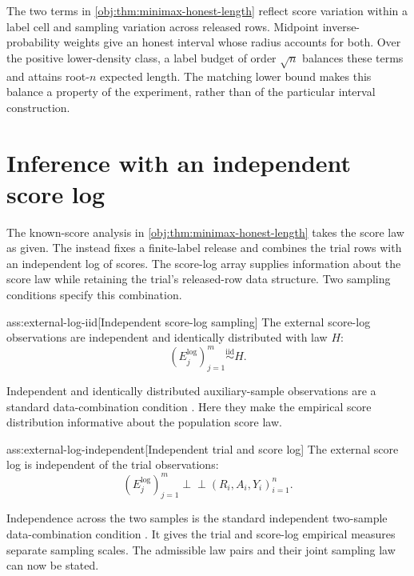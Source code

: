 \documentclass[11pt]{article}
\begin{document}
The two terms in \cref{obj:thm:minimax-honest-length} reflect score variation within a label cell and sampling variation across released rows. Midpoint inverse-probability weights give an honest interval whose radius accounts for both. Over the positive lower-density class, a label budget of order \(\sqrt n\) balances these terms and attains root-\(n\) expected length. The matching lower bound makes this balance a property of the experiment, rather than of the particular interval construction.


\section{Inference with an independent score log}

The known-score analysis in \cref{obj:thm:minimax-honest-length} takes the score law as given. The  instead fixes a finite-label release and combines the trial rows with an independent log of  scores. The score-log array  supplies information about the score law while retaining the trial’s released-row data structure. Two sampling conditions specify this combination.

\begin{assumptionv}{ass:external-log-iid}[Independent score-log sampling]
The external score-log observations are independent and identically distributed with law \(H\):
\[
(E_j^{\mathrm{log}})_{j=1}^m\stackrel{\mathrm{iid}}{\sim}H.
\]
\end{assumptionv}

Independent and identically distributed auxiliary-sample observations are a standard data-combination condition \citep{MarellaPfeffermann2019}. Here they make the empirical score distribution informative about the population score law.

\begin{assumptionv}{ass:external-log-independent}[Independent trial and score log]
The external score log is independent of the trial observations:
\[
(E_j^{\mathrm{log}})_{j=1}^m
\mathrel{\perp\!\!\!\perp}
(R_i,A_i,Y_i)_{i=1}^n.
\]
\end{assumptionv}

Independence across the two samples is the standard independent two-sample data-combination condition \citep{MarellaPfeffermann2019}. It gives the trial and score-log empirical measures separate sampling scales. The admissible law pairs and their joint sampling law can now be stated.
\end{document}
